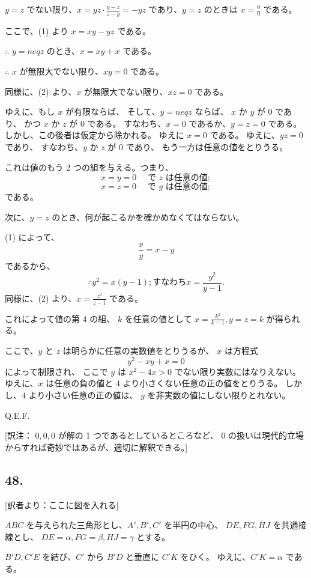 $y = z$ でない限り、$x = yz \cdot \frac{y-z}{z-y} = -yz$
であり、$y = z$ のときは $x = \frac{0}{0}$ である。

ここで、(1) より $x = xy - yz$ である。

$\therefore$ $y =neq z$ のとき、$x = xy + x$ である。

$\therefore$ $x$ が無限大でない限り、$xy = 0$ である。

同様に、(2) より、$x$ が無限大でない限り、$xz = 0$ である。

ゆえに、もし $x$ が有限ならば、
そして、$y =neq z$ ならば、
$x$ か $y$ が $0$ であり、
かつ $x$ か $z$ が $0$ である。
すなわち、$x = 0$ であるか、$y = z = 0$ である。
しかし、この後者は仮定から除かれる。
ゆえに $x = 0$ である。
ゆえに、$yz = 0$ であり、
すなわち、$y$ か $z$ が $0$ であり、
もう一方は任意の値をとりうる。

これは値のもう 2 つの組を与える。つまり、
\[
x = y = 0 \quad \mbox{ で $z$ は任意の値};
\]
\[
x = z = 0 \quad \mbox{ で $y$ は任意の値};
\]
である。

次に、$y = z$ のとき、何が起こるかを確かめなくてはならない。

(1) によって、
\[
\frac{x}{y} = x - y
\]
であるから、
\[
\therefore
y^2 = x ( y - 1);
\mbox{すなわち} x = \frac{y^2}{y - 1}.
\]
同様に、(2) より、$x = \frac{z^2}{z - 1}$ である。

これによって値の第 4 の組、
$k$ を任意の値として
$x = \frac{k^2}{k-1}, y = z = k$ が得られる。

ここで、$y$ と $z$ は明らかに任意の実数値をとりうるが、
$x$ は方程式
\[
y^2 - xy + x = 0
\]
によって制限され、
ここで $y$ は $x^2 - 4x > 0$ でない限り実数にはなりえない。
ゆえに、$x$ は任意の負の値と $4$ より小さくない任意の正の値をとりうる。
しかし、$4$ より小さい任意の正の値は、
$y$ を非実数の値にしない限りとれない。

Q.E.F.

[訳注： $0, 0, 0$ が解の 1 つであるとしているところなど、
$0$ の扱いは現代的立場からすれば奇妙ではあるが、適切に解釈できる。]


\subsection*{48.}

[訳者より：ここに図を入れる] 

$ABC$ を与えられた三角形とし、$A', B', C'$ を半円の中心、
$DE, FG, HJ$ を共通接線とし、
$DE = \alpha, FG = \beta, HJ = \gamma$ とする。

$B'D, C'E$ を結び、$C'$ から $B'D$ と垂直に $C'K$ をひく。
ゆえに、$C'K = \alpha$ である。

